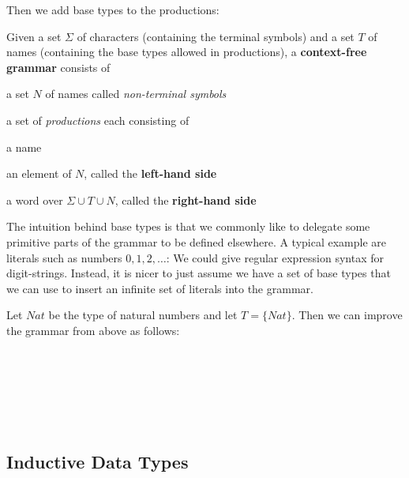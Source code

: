 Then we add base types to the productions:

\begin{definition}
Given a set $\Sigma$ of characters (containing the terminal symbols) and a set $T$ of names (containing the base types allowed in productions), a \textbf{context-free grammar} consists of
\begin{compactitem}
\item a set $N$ of names called \emph{non-terminal symbols}
\item a set of \emph{productions} each consisting of
 \begin{compactitem}
  \item a name
  \item an element of $N$, called the \textbf{left-hand side}
  \item a word over $\Sigma\cup T\cup N$, called the \textbf{right-hand side}
 \end{compactitem}
\end{compactitem}
\end{definition}

The intuition behind base types is that we commonly like to delegate some primitive parts of the grammar to be defined elsewhere.
A typical example are literals such as numbers $0, 1, 2,\ldots$: We could give regular expression syntax for digit-strings.
Instead, it is nicer to just assume we have a set of base types that we can use to insert an infinite set of literals into the grammar.

\begin{example}
Let $Nat$ be the type of natural numbers and let $T=\{Nat\}$.
Then we can improve the grammar from above as follows:
\begin{commgrammar}
\\
\\
\\
\\
\\
\end{commgrammar}
\end{example}

\subsection{Inductive Data Types}\label{sec:idt}


